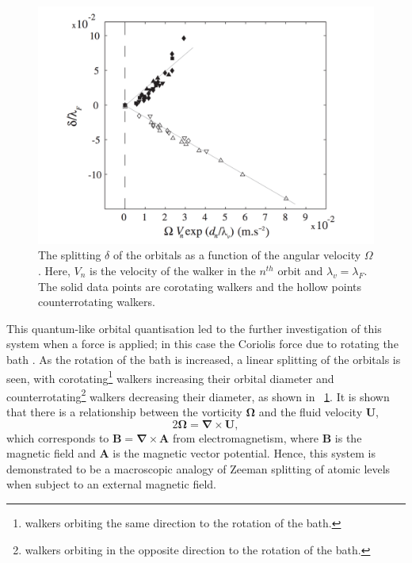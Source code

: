 \documentclass[11pt]{article}
\newcommand{\figref}[2][\figurename~]{#1\ref{#2}}
\begin{document}
\begin{figure}[h]
    \centering
    \includegraphics[width=0.65\columnwidth]{LevelSplitting.pdf}
    \caption{The splitting $\delta$ of the orbitals as a function of the angular velocity $\Omega$.  Here, $V_n$ is the velocity of the walker in the $n^{th}$ orbit and $\lambda_v=\lambda_F$.  The solid data points are corotating walkers and the hollow points counterrotating walkers.}
    \label{fig:levelsplitting}
\end{figure}

This quantum-like orbital quantisation led to the further investigation of this system when a force is applied; in this case the Coriolis force due to rotating the bath \cite{6}.  As the rotation of the bath is increased, a linear splitting of the orbitals is seen, with corotating\footnote{walkers orbiting the same direction to the rotation of the bath.} walkers increasing their orbital diameter and counterrotating\footnote{walkers orbiting in the opposite direction to the rotation of the bath.} walkers decreasing their diameter, as shown in \figref{fig:levelsplitting}.  It is shown that there is a relationship between the vorticity $\bm{\Omega}$ and the fluid velocity $\bm{U}$,
\begin{equation}
    \label{vorticity}
    2\bm{\Omega}=\bm{\nabla}\times\bm{U},
\end{equation}
which corresponds to $\bm{B}=\bm{\nabla}\times\bm{A}$ from electromagnetism, where $\bm{B}$ is the magnetic field and $\bm{A}$ is the magnetic vector potential.  Hence, this system is demonstrated to be a macroscopic analogy of Zeeman splitting of atomic levels when subject to an external magnetic field.

\end{document}
